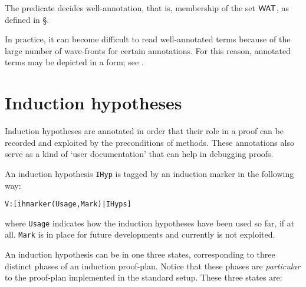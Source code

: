The predicate  decides well-annotation, that is,
membership of the set ${\sf WAT}$, as defined in \S{}.

In practice, it can become difficult to read well-annotated terms
because of the large number of wave-fronts for certain annotations.
For this reason, annotated terms may be depicted in a
 form; see .

\section {Induction hypotheses}
\label{sec:indhyps}
Induction hypotheses are annotated in order that their role in a
proof can be recorded and exploited by the preconditions of methods.
These annotations also serve as a kind of `user documentation' that
can help in debugging proofs.

An induction hypothesis {\tt IHyp} is tagged by an induction 
marker in the following way:
\begin{verbatim}
V:[ihmarker(Usage,Mark)|IHyps]
\end{verbatim}
where {\tt Usage} indicates how the induction hypotheses have been 
used so far, if at all. {\tt Mark} is in place for future developments and 
currently is not exploited. 

An induction hypothesis can be in one three states, corresponding to
three distinct phases of an induction proof-plan.  Notice that these
phases are {\em particular\/} to the proof-plan implemented in the
standard \clam{} setup.  These three states are:

